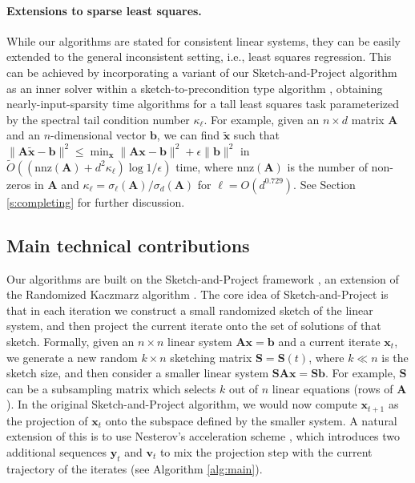 \documentclass[11pt]{article}
\def\nnz{\mathrm{nnz}}
\def\x{{\mathbf x}}
\def\v{{\mathbf v}}
\def\y{{\mathbf y}}
\def\b{{\mathbf b}}
\def\A{{\mathbf A}}
\def\S{{\mathbf S}}
\begin{document}
\paragraph{Extensions to sparse least squares.} While our algorithms are stated for consistent linear systems, they can be easily extended to the general inconsistent setting, i.e., least squares regression. This can be achieved by incorporating a variant of our Sketch-and-Project algorithm as an inner solver within a sketch-to-precondition type algorithm \cite{rokhlin2008fast}, obtaining nearly-input-sparsity time algorithms for a tall least squares task parameterized by the spectral tail condition number $\kappa_\ell$. 
For example, given an $n\times d$ matrix $\A$ and an $n$-dimensional vector $\b$, we can find $\tilde \x$ such that $\|\A\tilde\x-\b\|^2\leq\min_\x\|\A\x-\b\|^2+\epsilon\|\b\|^2$ in $\tilde O((\nnz(\A) + d^2\kappa_\ell)\log1/\epsilon)$ time, where $\nnz(\A)$ is the number of non-zeros in $\A$ and $\kappa_\ell = \sigma_\ell(\A)/\sigma_d(\A)$ for $\ell = O(d^{0.729})$. 
See Section \ref{s:completing} for further discussion.


\vspace{-3mm}
\subsection{Main technical contributions}

Our algorithms are built on the Sketch-and-Project framework \cite{gower2015randomized}, an extension of the Randomized Kaczmarz algorithm \cite{SV09:Randomized-Kaczmarz}. The core idea of Sketch-and-Project is that in each iteration we construct a small randomized sketch of the linear system, and then project the current iterate onto the set of solutions of that sketch. Formally, given an $n\times n$ linear system $\A\x=\b$ and a current iterate $\x_t$, we generate a new random $k\times n$ sketching matrix $\S=\S(t)$, where $k\ll n$ is the sketch size, and then consider a smaller linear system $\S\A\x=\S\b$. For example, $\S$ can be a subsampling matrix which selects $k$ out of $n$ linear equations (rows of $\A$). In the original Sketch-and-Project algorithm, we would now compute $\x_{t+1}$ as the projection of $\x_t$ onto the subspace defined by the smaller system. A natural extension of this is to use Nesterov's acceleration scheme \cite{gower2018accelerated}, which introduces two additional sequences $\y_t$ and $\v_t$ to mix the projection step with the current trajectory of the iterates (see Algorithm \ref{alg:main}).
\end{document}
